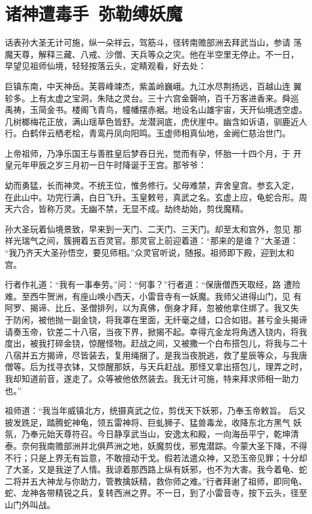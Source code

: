 \chapter{诸神遭毒手~弥勒缚妖魔}

话表孙大圣无计可施，纵一朵祥云，驾筋斗，径转南赡部洲去拜武当山，参请
荡魔天尊，解释三藏、八戒、沙僧、天兵等众之灾。他在半空里无停止。不一日，
早望见祖师仙境，轻轻按落云头，定睛观看，好去处：

巨镇东南，中天神岳。芙蓉峰竦杰，紫盖岭巍峨。九江水尽荆扬远，百越山连
翼轸多。上有太虚之宝洞，朱陆之灵台。三十六宫金磬响，百千万客进香来。舜巡
禹祷，玉简金书。楼阁飞青鸟，幢幡摆赤裾。地设名山雄宇宙，天开仙境透空虚。
几树榔梅花正放，满山瑶草色皆舒。龙潜涧底，虎伏崖中。幽含如诉语，驯鹿近人
行。白鹤伴云栖老桧，青鸾丹凤向阳鸣。玉虚师相真仙地，金阙仁慈治世门。

上帝祖师，乃净乐国王与善胜皇后梦吞日光，觉而有孕，怀胎一十四个月，于
开皇元年甲辰之岁三月初一日午时降诞于王宫。那爷爷：

幼而勇猛，长而神灵。不统王位，惟务修行。父母难禁，弃舍皇宫。参玄入定，
在此山中。功完行满，白日飞升。玉皇敕号，真武之名。玄虚上应，龟蛇合形。周
天六合，皆称万灵。无幽不禁，无显不成。劫终劫始，剪伐魔精。

孙大圣玩着仙境景致，早来到一天门、二天门、三天门。却至太和宫外，忽见
那祥光瑞气之间，簇拥着五百灵官。那灵官上前迎着道：“那来的是谁？”大圣道：
“我乃齐天大圣孙悟空，要见师相。”众灵官听说，随报。祖师即下殿，迎到太和
宫。

行者作礼道：“我有一事奉劳。”问：“何事？”行者道：“保唐僧西天取经，路
遭险难。至西牛贺洲，有座山唤小西天，小雷音寺有一妖魔。我师父进得山门，见
有阿罗、揭谛、比丘、圣僧排列，以为真佛，倒身才拜，忽被他拿住绑了。我又失
于防闲，被他抛一副金铙，将我罩在里面，无纤毫之缝，口合如钳。甚亏金头揭谛
请奏玉帝，钦差二十八宿，当夜下界，掀揭不起。幸得亢金龙将角透入铙内，将我
度出，被我打碎金铙，惊醒怪物。赶战之间，又被撒一个白布搭包儿，将我与二十
八宿并五方揭谛，尽皆装去，复用绳捆了。是我当夜脱逃，救了星辰等众，与我唐
僧等。后为找寻衣钵，又惊醒那妖，与天兵赶战。那怪又拿出搭包儿，理弄之时，
我却知道前音，遂走了。众等被他依然装去。我无计可施，特来拜求师相一助力也。”

祖师道：“我当年威镇北方，统摄真武之位，剪伐天下妖邪，乃奉玉帝敕旨。
后又披发跣足，踏腾蛇神龟，领五雷神将、巨虬狮子、猛兽毒龙，收降东北方黑气
妖氛，乃奉元始天尊符召。今日静享武当山，安逸太和殿，一向海岳平宁，乾坤清
泰。奈何我南赡部洲并北俱芦洲之地，妖魔剪伐，邪鬼潜踪。今蒙大圣下降，不得
不行；只是上界无有旨意，不敢擅动干戈。假若法遣众神，又恐玉帝见罪；十分却
了大圣，又是我逆了人情。我谅着那西路上纵有妖邪，也不为大害。我今着龟、蛇
二将并五大神龙与你助力，管教擒妖精，救你师之难。”行者拜谢了祖师，即同龟、
蛇、龙神各带精锐之兵，复转西洲之界。不一日，到了小雷音寺，按下云头，径至
山门外叫战。

